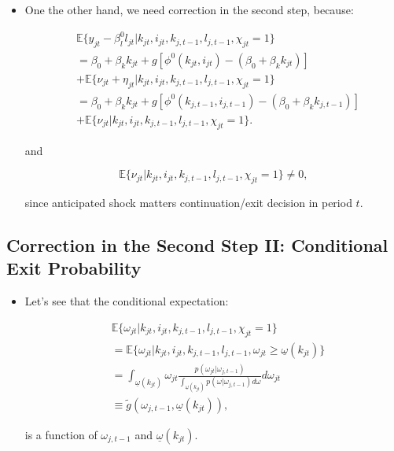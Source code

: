 \documentclass[]{book}
\providecommand{\tightlist}{%
  \setlength{\itemsep}{0pt}\setlength{\parskip}{0pt}}
\begin{document}
\begin{itemize}
\tightlist
\item
  One the other hand, we need correction in the second step, because:

  \begin{equation}
  \begin{split}
  &\mathbb{E}\{y_{jt} - \beta_l^0 l_{jt}|k_{jt}, i_{jt}, k_{j, t - 1}, l_{j, t - 1}, \chi_{jt} = 1\} \\
  &= \beta_0 + \beta_k k_{jt} + g[\phi^0(k_{jt}, i_{jt}) - (\beta_0 + \beta_k k_{jt})]\\
  & + \mathbb{E}\{\nu_{jt} + \eta_{jt}| k_{jt}, i_{jt}, k_{j, t - 1}, l_{j, t - 1}, \chi_{jt} = 1\}\\
  &= \beta_0 + \beta_k k_{jt} + g[\phi^0(k_{j, t - 1}, i_{j, t - 1}) - (\beta_0 + \beta_k k_{j, t - 1})]\\
  & + \mathbb{E}\{\nu_{jt}| k_{jt}, i_{jt}, k_{j, t - 1}, l_{j, t - 1} , \chi_{jt} = 1\}.
  \end{split}
  \end{equation}

  and

  \begin{equation}
  \mathbb{E}\{\nu_{jt}| k_{jt}, i_{jt}, k_{j, t - 1}, l_{j, t - 1}, \chi_{jt} = 1 \} \neq 0,
  \end{equation}

  since anticipated shock matters continuation/exit decision in period
  \(t\).
\end{itemize}

\subsection{Correction in the Second Step II: Conditional Exit
Probability}\label{correction-in-the-second-step-ii-conditional-exit-probability}

\begin{itemize}
\tightlist
\item
  Let's see that the conditional expectation:

  \begin{equation}
  \begin{split}
  &\mathbb{E}\{\omega_{jt}| k_{jt}, i_{jt}, k_{j, t - 1}, l_{j, t - 1}, \chi_{jt} = 1 \}\\
  &=\mathbb{E}\{\omega_{jt}| k_{jt}, i_{jt}, k_{j, t - 1}, l_{j, t - 1}, \omega_{jt} \ge \underline{\omega}(k_{jt}) \}\\
  &=\int_{\underline{\omega}(k_{jt})} \omega_{jt} \frac{p(\omega_{jt}|\omega_{j, t - 1})}{\int_{\underline{\omega}(k_{jt})} p(\omega|\omega_{j, t - 1}) d\omega } d \omega_{jt}\\
  &\equiv \tilde{g}(\omega_{j, t - 1}, \underline{\omega}(k_{jt})),
  \end{split}
  \end{equation}

  is a function of \(\omega_{j, t - 1}\) and
  \(\underline{\omega}(k_{jt})\).
\end{itemize}
\end{document}
